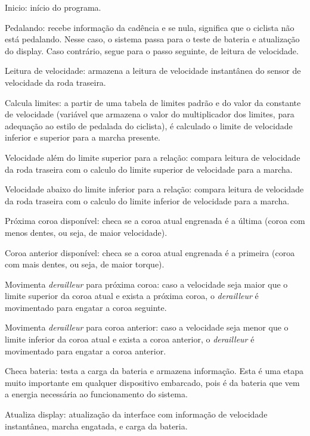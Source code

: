 \documentclass[a4paper,11pt]{article}
\begin{document}
\begin{description*}
  \item[Inicio:] início do programa.
  \item[Pedalando:] recebe informação da cadência e se nula, significa que o
  ciclista não está pedalando. Nesse caso, o sistema passa para o teste de
  bateria  e atualização do display. Caso contrário, segue para o passo
  seguinte, de  leitura de velocidade.
  \item[Leitura de velocidade:] armazena a leitura de velocidade instantânea do
  sensor de velocidade da roda traseira.
  \item[Calcula limites:] a partir de uma tabela de limites padrão e do valor da
  constante de velocidade (variável que armazena o valor do multiplicador dos
  limites, para adequação ao estilo de pedalada do ciclista), é calculado o
  limite de velocidade inferior e superior para a marcha presente.
  \item[Velocidade além do limite superior para a relação:] compara leitura de
  velocidade da roda traseira com o calculo do limite superior de velocidade
  para a marcha.
  \item[Velocidade abaixo do limite inferior para a relação:] compara leitura de
  velocidade da roda traseira com o calculo do limite inferior de velocidade
  para a marcha.
  \item[Próxima coroa disponível:] checa se a coroa atual engrenada é a última
  (coroa
  com menos dentes, ou seja, de maior velocidade).
  \item[Coroa anterior disponível:] checa se a coroa atual engrenada é a
  primeira (coroa com mais dentes, ou seja, de maior torque).
  \item[Movimenta \textit{derailleur} para próxima coroa:] caso a velocidade
  seja  maior que o limite superior da coroa atual e exista a próxima coroa, o
  \textit{derailleur}  é movimentado para engatar a coroa seguinte.
  \item[Movimenta \textit{derailleur} para coroa anterior:] caso a velocidade
  seja  menor que o limite inferior da coroa atual e exista a coroa anterior, o
  \textit{derailleur}  é movimentado para engatar a coroa anterior.
  \item[Checa bateria:] testa a carga da bateria e armazena informação. Esta é
  uma etapa muito importante em qualquer dispositivo embarcado, pois é da
  bateria que vem a energia necessária ao funcionamento do sistema.
  \item[Atualiza display:] atualização da interface com informação de velocidade
  instantânea, marcha engatada, e carga da bateria.
\end{description*}
\end{document}
